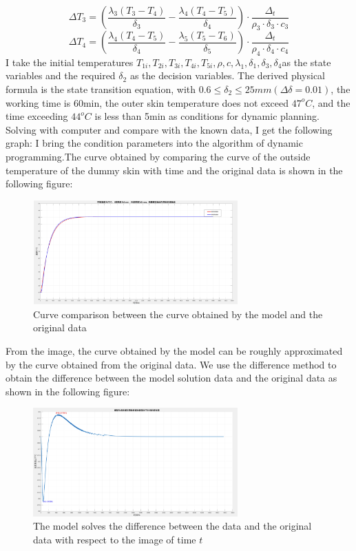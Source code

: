 \documentclass[12pt]{ctexart}
\begin{document}
\[\Delta T_{3} = (\frac{\lambda_{3}(T_{3}-T_{4})}{\delta_{3}} - \frac{\lambda_{4}(T_{4}-T_{5})}{\delta_{4}})\cdot\frac{\Delta_{t}}{\rho_{3}\cdot\delta_{3}\cdot c_{3}}\]
\[\Delta T_{4} = (\frac{\lambda_{4}(T_{4}-T_{5})}{\delta_{4}} - \frac{\lambda_{5}(T_{5}-T_{6})}{\delta_{5}})\cdot\frac{\Delta_{t}}{\rho_{4}\cdot\delta_{4}\cdot c_{4}}\]
\indent I take the initial temperatures $T_{1i} , T_{2i} , T_{3i} , T_{4i} , T_{5i} , \rho , c , \lambda_{1} , \delta_{1} , \delta_{3} , \delta_{4} $as the state variables and the required $\delta_{2}$ as the decision variables. The derived physical formula is the state transition equation, with $0.6 \leq \delta_{2} \leq 25mm (\Delta \delta = 0.01)$, the working time is 60min, the outer skin temperature does not exceed $47^{o}C$, and the time exceeding $44^{o}C$ is less than 5min as conditions for dynamic planning. Solving with computer\cite{buchanan1962calculus} and compare with the known data, I get the following graph:
I bring the condition parameters into the algorithm of dynamic programming.The curve obtained by comparing the curve of the outside temperature of the dummy skin with time and the original data is shown in the following figure:
\begin{figure}[H]
\centering
\includegraphics[width=0.7\textwidth]{4.png}
\caption{Curve comparison between the curve obtained by the model and the original data}
\end{figure}
\indent From the image, the curve obtained by the model can be roughly approximated by the curve obtained from the original data. We use the difference method to obtain the difference between the model solution data and the original data as shown in the following figure:
\begin{figure}[H]
\centering
\includegraphics[width=0.7\textwidth]{5.png}
\caption{The model solves the difference between the data and the original data with respect to the image of time $t$}
\end{figure}
\end{document}
